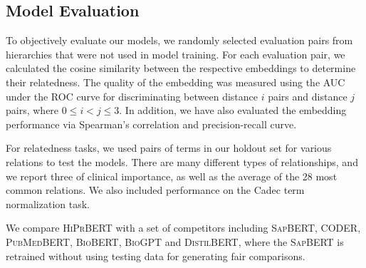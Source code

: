 \documentclass[12pt,a4paper]{cibb}
\begin{document}
\subsection{Model Evaluation}
To objectively evaluate our models, we randomly selected evaluation pairs from hierarchies that were not used in model training. For each evaluation pair, we calculated the cosine similarity between the respective embeddings to determine their relatedness. The quality of the embedding was measured using the AUC under the ROC curve for discriminating between distance $i$ pairs and distance $j$ pairs, where $0\le i<j\le 3$. In addition, we have also evaluated the embedding performance via Spearman's correlation and precision-recall curve.

For relatedness tasks, we used pairs of terms in our holdout set for various relations to test the models. There are many different types of relationships, and we report three of clinical importance, as well as the average of the 28 most common relations. We also included performance on the Cadec term normalization task.


We compare \textsc{HiPrBERT} with a set of competitors including \textsc{SapBERT}, CODER, \textsc{PubMedBERT}, \textsc{BioBERT}, \textsc{BioGPT} and \textsc{DistilBERT}, where the \textsc{SapBERT} is retrained without using testing data for generating fair comparisons. 
\end{document}
